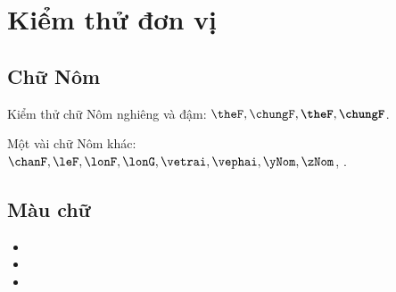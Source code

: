 \chapter*{Kiểm thử đơn vị}

\section{Chữ Nôm}

Kiểm thử chữ Nôm nghiêng và đậm: $\theF, \chungF, \textbf{\theF}, \textbf{\chungF}$.

Một vài chữ Nôm khác: $\chanF, \leF, \lonF, \lonG, \vetrai, \vephai, \yNom, \zNom$, \duongNom.

\section{Màu chữ}

\begin{itemize}
   \item {}
   \item {}
   \item {}
\end{itemize}






